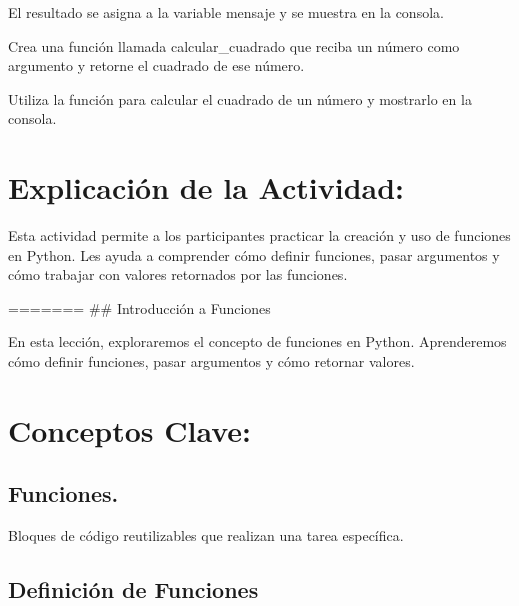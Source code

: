 \documentclass[
  a4paper,
  onepage,
  openany]{scrreprt}
\begin{document}
El resultado se asigna a la variable mensaje y se muestra en la consola.

\begin{tcolorbox}[enhanced jigsaw, breakable, opacityback=0, toptitle=1mm, coltitle=black, toprule=.15mm, rightrule=.15mm, colframe=quarto-callout-important-color-frame, opacitybacktitle=0.6, arc=.35mm, title=\textcolor{quarto-callout-important-color}{\faExclamation}\hspace{0.5em}{Actividad Práctica:}, titlerule=0mm, colbacktitle=quarto-callout-important-color!10!white, bottomtitle=1mm, bottomrule=.15mm, colback=white, left=2mm, leftrule=.75mm]

Crea una función llamada calcular\_cuadrado que reciba un número como
argumento y retorne el cuadrado de ese número.

Utiliza la función para calcular el cuadrado de un número y mostrarlo en
la consola.

\end{tcolorbox}

\hypertarget{explicaciuxf3n-de-la-actividad-42}{%
\section{Explicación de la
Actividad:}\label{explicaciuxf3n-de-la-actividad-42}}

Esta actividad permite a los participantes practicar la creación y uso
de funciones en Python. Les ayuda a comprender cómo definir funciones,
pasar argumentos y cómo trabajar con valores retornados por las
funciones.

======= \#\# Introducción a Funciones

En esta lección, exploraremos el concepto de funciones en Python.
Aprenderemos cómo definir funciones, pasar argumentos y cómo retornar
valores.

\hypertarget{conceptos-clave-45}{%
\section{Conceptos Clave:}\label{conceptos-clave-45}}

\hypertarget{funciones.-1}{%
\subsection{Funciones.}\label{funciones.-1}}

Bloques de código reutilizables que realizan una tarea específica.

\hypertarget{definiciuxf3n-de-funciones-1}{%
\subsection{Definición de
Funciones}\label{definiciuxf3n-de-funciones-1}}
\end{document}
